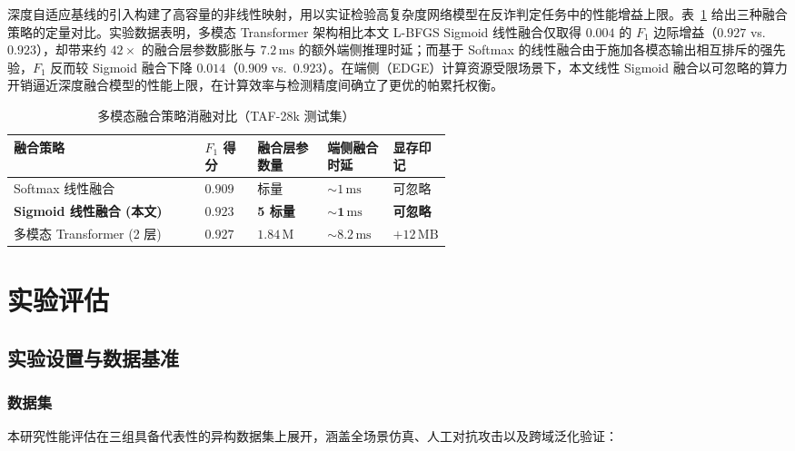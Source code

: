 \documentclass[11pt, a4paper]{article}
\begin{document}
深度自适应基线的引入构建了高容量的非线性映射，用以实证检验高复杂度网络模型在反诈判定任务中的性能增益上限。表~\ref{tab:fusion_ablation} 给出三种融合策略的定量对比。实验数据表明，多模态 Transformer 架构相比本文 L-BFGS Sigmoid 线性融合仅取得 $0.004$ 的 $F_1$ 边际增益（$0.927$ vs.\ $0.923$），却带来约 $42\times$ 的融合层参数膨胀与 $7.2\,\mathrm{ms}$ 的额外端侧推理时延；而基于 Softmax 的线性融合由于施加各模态输出相互排斥的强先验，$F_1$ 反而较 Sigmoid 融合下降 $0.014$（$0.909$ vs.\ $0.923$）。在端侧（EDGE）计算资源受限场景下，本文线性 Sigmoid 融合以可忽略的算力开销逼近深度融合模型的性能上限，在计算效率与检测精度间确立了更优的帕累托权衡。

\begin{table}[htbp]
\centering
\caption{多模态融合策略消融对比（TAF-28k 测试集）}
\label{tab:fusion_ablation}
\small
\renewcommand{\arraystretch}{1.2}
\begin{tabular}{l>{\centering\arraybackslash}p{0.12\linewidth}>{\centering\arraybackslash}p{0.16\linewidth}>{\centering\arraybackslash}p{0.15\linewidth}>{\centering\arraybackslash}p{0.13\linewidth}}
\toprule
\textbf{融合策略} & \textbf{$F_1$ 得分} & \textbf{融合层参数量} & \textbf{端侧融合时延} & \textbf{显存印记} \\
\midrule
Softmax 线性融合 & $0.909$ & 5 标量 & $\sim 1\,\mathrm{ms}$ & 可忽略 \\
\rowcolor[gray]{0.93}\textbf{Sigmoid 线性融合 (本文)} & $\mathbf{0.923}$ & \textbf{5 标量} & $\mathbf{\sim 1\,\mathrm{ms}}$ & \textbf{可忽略} \\
多模态 Transformer (2 层) & $0.927$ & $1.84\,\mathrm{M}$ & $\sim 8.2\,\mathrm{ms}$ & $+12\,\mathrm{MB}$ \\
\bottomrule
\end{tabular}
\end{table}

\section{实验评估}
\subsection{实验设置与数据基准}
\subsubsection{数据集}

本研究性能评估在三组具备代表性的异构数据集上展开，涵盖全场景仿真、人工对抗攻击以及跨域泛化验证：
\end{document}
